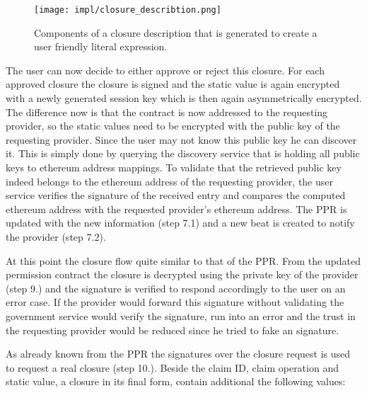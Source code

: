 \begin{figure}
\texttt{[image: impl/closure\_describtion.png]}
\centering
\caption{Components of a closure description that is generated to create a user friendly literal expression.}
\label{fig:closureDescription}
\end{figure}

The user can now decide to either approve or reject this closure. For each approved closure the closure is signed and the static value is again encrypted with a newly generated session key which is then again asymmetrically encrypted. The difference now is that the contract is now addressed to the requesting provider, so the static values need to be encrypted with the public key of the requesting provider. Since the user may not know this public key he can discover it. This is simply done by querying the discovery service that is holding all public keys to ethereum address mappings. To validate that the retrieved public key indeed belongs to the ethereum address of the requesting provider, the user service verifies the signature of the received entry and compares the computed ethereum address with the requested provider’s ethereum address. The PPR is updated with the new information (step 7.1) and a new beat is created to notify the provider (step 7.2). 

At this point the closure flow quite similar to that of the PPR. From the updated permission contract  the closure is decrypted using the private key of the provider (step 9.) and the signature is verified to respond accordingly to the user on an error case. If the provider would forward this signature without validating the government service would verify the signature, run into an error and the trust in the requesting provider would be reduced since he tried to fake an signature. 

As already known from the PPR the signatures over the closure request is used to request a real closure (step 10.). Beside the claim ID, claim operation and static value, a closure in its final form, contain additional the following values: 

